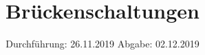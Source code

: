 

\subject{302}
\title{Brückenschaltungen}
\date{%
  Durchführung: 26.11.2019
  \hspace{3em}
  Abgabe: 02.12.2019
}



\maketitle
\thispagestyle{empty}
\tableofcontents
\newpage







\printbibliography{}


